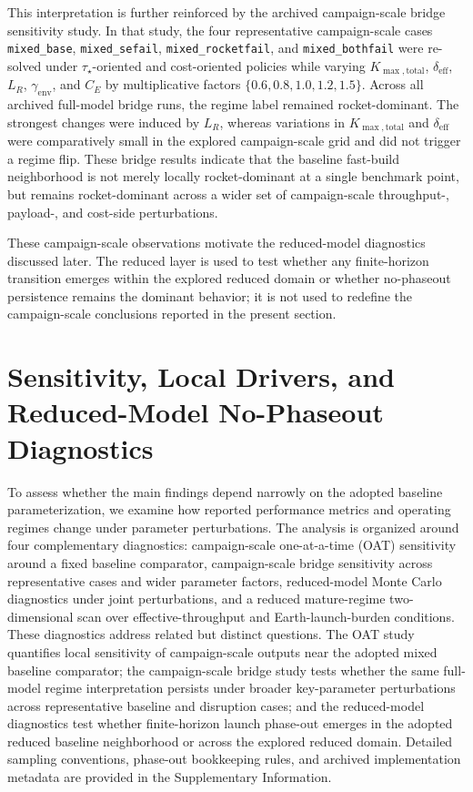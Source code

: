 \documentclass[12pt]{article}
\begin{document}
This interpretation is further reinforced by the archived campaign-scale bridge sensitivity study. In that study, the four representative campaign-scale cases \texttt{mixed\_base}, \texttt{mixed\_sefail}, \texttt{mixed\_rocketfail}, and \texttt{mixed\_bothfail} were re-solved under \(\tau_\star\)-oriented and cost-oriented policies while varying \(K_{\max,\mathrm{total}}\), \(\delta_{\mathrm{eff}}\), \(L_R\), \(\gamma_{\mathrm{env}}\), and \(C_E\) by multiplicative factors \(\{0.6,0.8,1.0,1.2,1.5\}\). Across all archived full-model bridge runs, the regime label remained rocket-dominant. The strongest changes were induced by \(L_R\), whereas variations in \(K_{\max,\mathrm{total}}\) and \(\delta_{\mathrm{eff}}\) were comparatively small in the explored campaign-scale grid and did not trigger a regime flip. These bridge results indicate that the baseline fast-build neighborhood is not merely locally rocket-dominant at a single benchmark point, but remains rocket-dominant across a wider set of campaign-scale throughput-, payload-, and cost-side perturbations.

These campaign-scale observations motivate the reduced-model diagnostics discussed later. The reduced layer is used to test whether any finite-horizon transition emerges within the explored reduced domain or whether no-phaseout persistence remains the dominant behavior; it is not used to redefine the campaign-scale conclusions reported in the present section.


\section{Sensitivity, Local Drivers, and Reduced-Model No-Phaseout Diagnostics}
\label{sec:sensitivity}

To assess whether the main findings depend narrowly on the adopted baseline parameterization, we examine how reported performance metrics and operating regimes change under parameter perturbations. The analysis is organized around four complementary diagnostics: campaign-scale one-at-a-time (OAT) sensitivity around a fixed baseline comparator, campaign-scale bridge sensitivity across representative cases and wider parameter factors, reduced-model Monte Carlo diagnostics under joint perturbations, and a reduced mature-regime two-dimensional scan over effective-throughput and Earth-launch-burden conditions. These diagnostics address related but distinct questions. The OAT study quantifies local sensitivity of campaign-scale outputs near the adopted mixed baseline comparator; the campaign-scale bridge study tests whether the same full-model regime interpretation persists under broader key-parameter perturbations across representative baseline and disruption cases; and the reduced-model diagnostics test whether finite-horizon launch phase-out emerges in the adopted reduced baseline neighborhood or across the explored reduced domain. Detailed sampling conventions, phase-out bookkeeping rules, and archived implementation metadata are provided in the Supplementary Information.
\end{document}
